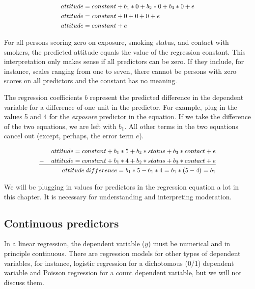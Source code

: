 \documentclass[a4paper]{book}
\theoremstyle{definition}
\theoremstyle{definition}
\theoremstyle{definition}
\theoremstyle{remark}
\begin{document}
\begin{equation}
\small
\begin{split}
  attitude &= constant + b_1*0 + b_2*0 + b_3*0 + e \\ 
  attitude &= constant + 0 + 0 + 0 + e \\
  attitude &= constant + e
\end{split}
  \label{eq:regsmokedummy} 
\normalsize
\end{equation}

For all persons scoring zero on exposure, smoking status, and contact
with smokers, the predicted attitude equals the value of the regression
constant. This interpretation only makes sense if all predictors can be
zero. If they include, for instance, scales ranging from one to seven,
there cannot be persons with zero scores on all predictors and the
constant has no meaning.

The regression coefficients \(b\) represent the predicted difference in
the dependent variable for a difference of one unit in the predictor.
For example, plug in the values 5 and 4 for the \emph{exposure}
predictor in the equation. If we take the difference of the two
equations, we are left with \(b_1\). All other terms in the two
equations cancel out (except, perhaps, the error term \(e\)).

\begin{equation}
\small
\begin{split}
  attitude = constant + b_1*5 + b_2*status + b_3*contact + e \\ 
  \underline{- \mspace{20mu} attitude = constant + b_1*4 + b_2*status + b_3*contact + e} \\
  attitude \mspace{4mu} difference = b_1*5 - b_1*4 = b_1*(5-4) = b_1
\end{split}
\label{eq:regweight} 
\normalsize
\end{equation}

We will be plugging in values for predictors in the regression equation
a lot in this chapter. It is necessary for understanding and
interpreting moderation.

\subsection{Continuous predictors}\label{continuous-predictors}

In a linear regression, the dependent variable (\(y\)) must be numerical
and in principle continuous. There are regression models for other types
of dependent variables, for instance, logistic regression for a
dichotomous (0/1) dependent variable and Poisson regression for a count
dependent variable, but we will not discuss them.
\end{document}
